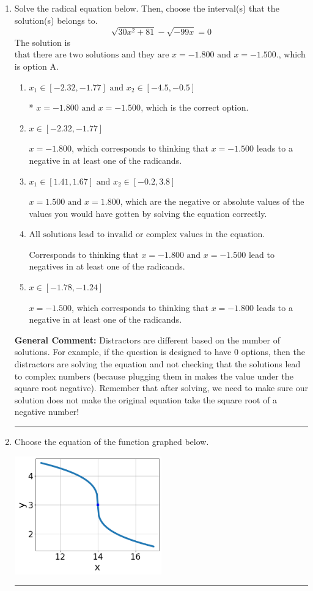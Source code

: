 \documentclass{extbook}[14pt]
\newcommand{\litem}[1]{\item #1

\rule{\textwidth}{0.4pt}}
\begin{document}
\begin{enumerate}\litem{
Solve the radical equation below. Then, choose the interval(s) that the solution(s) belongs to.
\[ \sqrt{30 x^2 + 81} - \sqrt{-99 x} = 0 \]The solution is \( \text{that there are two solutions and they are } x = -1.800 \text{ and } x = -1.500. \), which is option A.\begin{enumerate}[label=\Alph*.]
\item \( x_1 \in [-2.32, -1.77] \text{ and } x_2 \in [-4.5,-0.5] \)

* $x = -1.800 \text{ and } x = -1.500$, which is the correct option.
\item \( x \in [-2.32,-1.77] \)

$x = -1.800$, which corresponds to thinking that $x = -1.500$ leads to a negative in at least one of the radicands.
\item \( x_1 \in [1.41, 1.67] \text{ and } x_2 \in [-0.2,3.8] \)

$x = 1.500 \text{ and } x = 1.800$, which are the negative or absolute values of the values you would have gotten by solving the equation correctly.
\item \( \text{All solutions lead to invalid or complex values in the equation.} \)

Corresponds to thinking that $x = -1.800 \text{ and } x = -1.500$ lead to negatives in at least one of the radicands.
\item \( x \in [-1.78,-1.24] \)

$x = -1.500$, which corresponds to thinking that $x = -1.800$ leads to a negative in at least one of the radicands.
\end{enumerate}

\textbf{General Comment:} Distractors are different based on the number of solutions. For example, if the question is designed to have 0 options, then the distractors are solving the equation and not checking that the solutions lead to complex numbers (because plugging them in makes the value under the square root negative). Remember that after solving, we need to make sure our solution does not make the original equation take the square root of a negative number!
}
\litem{
Choose the equation of the function graphed below.

\begin{center}
    \includegraphics[width=0.5\textwidth]{../Figures/radicalGraphToEquationB.png}
\end{center}


}
\end{enumerate}
\end{document}

